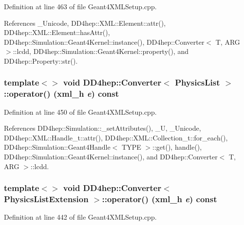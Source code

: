Definition at line 463 of file Geant4XMLSetup.cpp.

References \_\-Unicode, DD4hep::XML::Element::attr(), DD4hep::XML::Element::hasAttr(), DD4hep::Simulation::Geant4Kernel::instance(), DD4hep::Converter$<$ T, ARG $>$::lcdd, DD4hep::Simulation::Geant4Kernel::property(), and DD4hep::Property::str().\hypertarget{struct_d_d4hep_1_1_converter_a06222925c37fe5b58a430c75bc9f0d21}{
\subsubsection[{operator()}]{\setlength{\rightskip}{0pt plus 5cm}template$<$$>$ void {\bf DD4hep::Converter}$<$ {\bf PhysicsList} $>$::operator() ({\bf xml\_\-h} {\em e}) const}}
\label{struct_d_d4hep_1_1_converter_a06222925c37fe5b58a430c75bc9f0d21}


Definition at line 450 of file Geant4XMLSetup.cpp.

References DD4hep::Simulation::\_\-setAttributes(), \_\-U, \_\-Unicode, DD4hep::XML::Handle\_\-t::attr(), DD4hep::XML::Collection\_\-t::for\_\-each(), DD4hep::Simulation::Geant4Handle$<$ TYPE $>$::get(), handle(), DD4hep::Simulation::Geant4Kernel::instance(), and DD4hep::Converter$<$ T, ARG $>$::lcdd.\hypertarget{struct_d_d4hep_1_1_converter_ac2103dd4e8fa1443874b9fe0753f5485}{
\subsubsection[{operator()}]{\setlength{\rightskip}{0pt plus 5cm}template$<$$>$ void {\bf DD4hep::Converter}$<$ PhysicsListExtension $>$::operator() ({\bf xml\_\-h} {\em e}) const}}
\label{struct_d_d4hep_1_1_converter_ac2103dd4e8fa1443874b9fe0753f5485}


Definition at line 442 of file Geant4XMLSetup.cpp.

